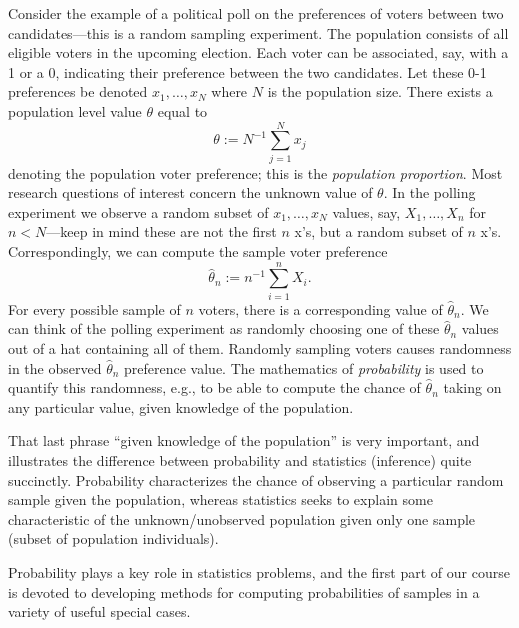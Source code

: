 \documentclass[
]{book}
\begin{document}
Consider the example of a political poll on the preferences of voters between two candidates---this is a random sampling experiment. The population consists of all eligible voters in the upcoming election. Each voter can be associated, say, with a 1 or a 0, indicating their preference between the two candidates. Let these 0-1 preferences be denoted \(x_1, \ldots, x_N\) where \(N\) is the population size. There exists a population level value \(\theta\) equal to
\[\theta:=N^{-1}\sum_{j=1}^N x_j\]
denoting the population voter preference; this is the \emph{population proportion}. Most research questions of interest concern the unknown value of \(\theta\). In the polling experiment we observe a random subset of \(x_1, \ldots, x_N\) values, say, \(X_1, \ldots, X_n\) for \(n<N\)---keep in mind these are not the first \(n\) x's, but a random subset of \(n\) x's. Correspondingly, we can compute the sample voter preference
\[\hat\theta_n := n^{-1}\sum_{i=1}^n X_i.\]
For every possible sample of \(n\) voters, there is a corresponding value of \(\hat\theta_n\). We can think of the polling experiment as randomly choosing one of these \(\hat\theta_n\) values out of a hat containing all of them. Randomly sampling voters causes randomness in the observed \(\hat\theta_n\) preference value. The mathematics of \emph{probability} is used to quantify this randomness, e.g., to be able to compute the chance of \(\hat\theta_n\) taking on any particular value, given knowledge of the population.

That last phrase ``given knowledge of the population'' is very important, and illustrates the difference between probability and statistics (inference) quite succinctly. Probability characterizes the chance of observing a particular random sample given the population, whereas statistics seeks to explain some characteristic of the unknown/unobserved population given only one sample (subset of population individuals).

Probability plays a key role in statistics problems, and the first part of our course is devoted to developing methods for computing probabilities of samples in a variety of useful special cases.
\end{document}

